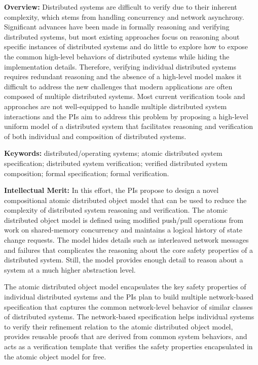 
{\bf Overview:} Distributed systems are difficult to verify due to
their inherent complexity, which stems from handling concurrency and
network asynchrony.  Significant advances have been made in formally
reasoning and verifying distributed systems, but most existing
approaches focus on reasoning about specific instances of distributed
systems and do little to explore how to expose the common high-level
behaviors of distributed systems while hiding the implementation
details.  Therefore, verifying individual distributed systems requires
redundant reasoning and the absence of a high-level model makes it
difficult to address the new challenges that modern applications are
often composed of multiple distributed systems.  Most current
verification tools and approaches are not well-equipped to handle
multiple distributed system interactions and the PIs aim to address
this problem by proposing a high-level uniform model of a distributed
system that facilitates reasoning and verification of both individual
and composition of distributed systems.

{\bf Keywords:} distributed/operating systems; atomic distributed
system specification; distributed system verification; verified
distributed system composition; formal specification; formal
verification.


{\bf Intellectual Merit:} In this effort, the PIs propose to design a
novel compositional atomic distributed object model that can be used
to reduce the complexity of distributed system reasoning and
verification. The atomic distributed object model is defined using
modified push/pull operations from work on shared-memory concurrency
and maintains a logical history of state change requests. The model
hides details such as interleaved network messages and failures that
complicates the reasoning about the core safety properties of a
distributed system. Still, the model provides enough detail to reason
about a system at a much higher abstraction level.

The atomic distributed object model encapsulates the key safety
properties of individual distributed systems and the PIs plan to build
multiple network-based specification that captures the common
network-level behavior of similar classes of distributed systems.  The
network-based specification helps individual systems to verify their
refinement relation to the atomic distributed object model, provides
reusable proofs that are derived from common system behaviors, and
acts as a verification template that verifies the safety properties
encapsulated in the atomic object model for free.

